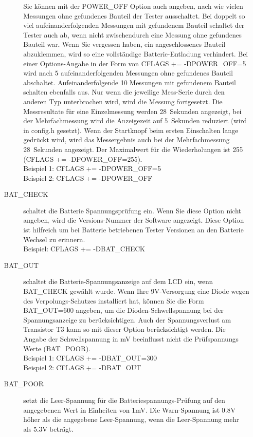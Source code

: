 \begin{description}
Sie können mit der POWER\_OFF Option auch angeben, nach wie vielen Messungen ohne gefundenes Bauteil der Tester ausschaltet.
Bei doppelt so viel aufeinanderfolgenden Messungen mit gefundenem Bauteil schaltet der Tester auch ab,
wenn nicht zwischendurch eine Messung ohne gefundenes Bauteil war.
Wenn Sie vergessen haben, ein angeschlossenes Bauteil abzuklemmen, wird so eine vollständige Batterie-Entladung
verhindert.
Bei einer Options-Angabe in der Form von CFLAGS += -DPOWER\_OFF=5 wird nach 5 aufeinanderfolgenden Messungen ohne
gefundenes Bauteil abschaltet. Aufeinanderfolgende 10 Messungen mit gefundenem Bauteil schalten ebenfalls aus.
Nur wenn die jeweilige Mess-Serie durch den anderen Typ unterbrochen wird, wird die Messung fortgesetzt.
Die Messresultate für eine Einzelmessung werden 28~Sekunden angezeigt, bei der Mehrfachmessung wird die
Anzeigezeit auf 5~Sekunden reduziert (wird in config.h gesetzt).
Wenn der Startknopf beim ersten Einschalten lange gedrückt wird, wird das Messergebnis
 auch bei der Mehrfachmessung 28~Sekunden angezeigt.
Der Maximalwert für die Wiederholungen ist 255 (CFLAGS += -DPOWER\_OFF=255).\\
Beispiel 1: CFLAGS += -DPOWER\_OFF=5 \\
Beispiel 2: CFLAGS += -DPOWER\_OFF 
  \item[BAT\_CHECK] schaltet die Batterie Spannungsprüfung ein.
 Wenn Sie diese Option nicht angeben, wird die Versions-Nummer der Software angezeigt.
Diese Option ist hilfreich um bei Batterie betriebenen Tester Versionen an den Batterie Wechsel zu erinnern.\\
Beispiel: CFLAGS += -DBAT\_CHECK
  \item[BAT\_OUT] schaltet die Batterie-Spannungsanzeige auf dem LCD ein, wenn BAT\_CHECK gewählt wurde.
 Wenn Ihre 9V-Versorgung eine Diode wegen des Verpolungs-Schutzes installiert hat, können Sie 
die Form BAT\_OUT=600 angeben, um die Dioden-Schwellspannung 
bei der Spannungsanzeige zu berücksichtigen.
Auch der Spannungsverlust am Transistor T3 kann so mit dieser Option berücksichtigt werden.
Die Angabe der Schwellspannung in mV beeinflusst nicht die Prüf\-span\-nungs Werte (BAT\_POOR).\\
Beispiel 1: CFLAGS += -DBAT\_OUT=300 \\
Beispiel 2: CFLAGS += -DBAT\_OUT
  \item[BAT\_POOR] setzt die Leer-Spannung für die Batteriespannungs-Prüfung auf den angegebenen Wert in Einheiten von 1mV.
Die Warn-Spannung ist 0.8V höher als die angegebene Leer-Spannung, wenn die Leer-Spannung mehr als 5.3V beträgt.

\end{description}
